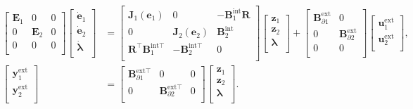 \documentclass{svjour3}                     %
\begin{document}
	\begin{equation}
	\label{eq:int_beams}
	\begin{aligned}
	\begin{bmatrix}
	\mathbf{E}_1 & 0 & 0 \\ 
	0 & \mathbf{E}_2 & 0 \\
	0 & 0 & 0 \\
	\end{bmatrix}
	\begin{bmatrix}
	\dot{\mathbf{e}}_1 \\ \dot{\mathbf{e}}_2 \\ \dot{\bm{\lambda}} \\
	\end{bmatrix} &= 
	\begin{bmatrix}
	\mathbf{J}_1(\mathbf{e}_1) & 0 & -\mathbf{B}_1^{\text{int}} \mathbf{R} \\ 
	0 & \mathbf{J}_2(\mathbf{e}_2) & \mathbf{B}_2^{\text{int}} \\
	\mathbf{R}^\top \mathbf{B}_1^{\text{int} \top} & - \mathbf{B}_2^{\text{int} \top} & 0 \\
	\end{bmatrix}
	\begin{bmatrix}
	\mathbf{z}_1  \\ 
	\mathbf{z}_2  \\ 
	\bm{\lambda} \\
	\end{bmatrix}+ 
	\begin{bmatrix}
	\mathbf{B}_{\partial 1}^{\text{ext}} & 0 \\ 0 & \mathbf{B}_{\partial 2}^{\text{ext}} \\ 0 & 0 \\
	\end{bmatrix} 
	\begin{bmatrix}
	\mathbf{u}_1^{\text{ext}} \\ 
	\mathbf{u}_2^{\text{ext}} \\
	\end{bmatrix}, \\
	\begin{bmatrix}
	\mathbf{y}_1^{\text{ext}} \\ \mathbf{y}_2^{\text{ext}} \\
	\end{bmatrix}  &= \begin{bmatrix}
	\mathbf{B}_{\partial 1}^{\text{ext} \top} & 0 & 0 \\
	0 & \mathbf{B}_{\partial 2}^{\text{ext} \top} & 0 \\
	\end{bmatrix} \begin{bmatrix}
	\mathbf{z}_1  \\ 
	\mathbf{z}_2  \\ 
	\bm{\lambda} \\
	\end{bmatrix}.
	\end{aligned}
	\end{equation}
	
\end{document}
